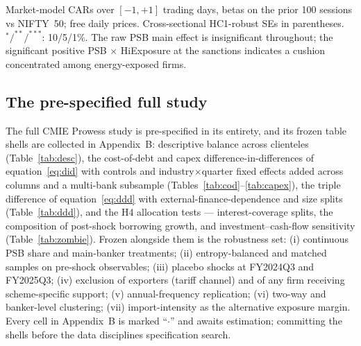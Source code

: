 \documentclass[12pt]{article}
\begin{document}
\begin{table}[t]
\centering
\begin{threeparttable}
\caption{Pilot equity event study: PSB attachment and cumulative abnormal returns}
\label{tab:p-es}
\small

\begin{tablenotes}\footnotesize
\item Market-model CARs over $[-1,+1]$ trading days, betas on the prior 100 sessions vs
NIFTY~50; free daily prices. Cross-sectional HC1-robust SEs in parentheses.
$^{*}/^{**}/^{***}$: 10/5/1\%. The raw PSB main effect is insignificant throughout; the
significant positive PSB $\times$ HiExposure at the sanctions indicates a cushion concentrated
among energy-exposed firms.
\end{tablenotes}
\end{threeparttable}
\end{table}

\subsection{The pre-specified full study}\label{sec:full-cod}

The full CMIE Prowess study is pre-specified in its entirety, and its frozen table shells
are collected in Appendix~B: descriptive balance across clienteles
(Table~\ref{tab:desc}), the cost-of-debt and capex difference-in-differences of
equation~\eqref{eq:did} with controls and industry$\times$quarter fixed effects added
across columns and a multi-bank subsample (Tables~\ref{tab:cod}--\ref{tab:capex}), the
triple difference of equation~\eqref{eq:ddd} with external-finance-dependence and size
splits (Table~\ref{tab:ddd}), and the H4 allocation tests --- interest-coverage splits,
the composition of post-shock borrowing growth, and investment--cash-flow sensitivity
(Table~\ref{tab:zombie}). Frozen alongside them is the robustness set: (i) continuous PSB
share and main-banker treatments; (ii) entropy-balanced and matched samples on pre-shock
observables; (iii) placebo shocks at FY2024Q3 and FY2025Q3; (iv) exclusion of exporters
(tariff channel) and of any firm receiving scheme-specific support; (v) annual-frequency
replication; (vi) two-way and banker-level clustering; (vii) import-intensity as the
alternative exposure margin. Every cell in Appendix~B is marked ``$\cdot$'' and awaits
estimation; committing the shells before the data disciplines specification search.

\end{document}
